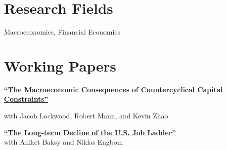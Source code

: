 \documentclass[margin,line]{res}                          %
\newenvironment{list1}{
	\begin{list}{\ding{113}}{%
			\setlength{\itemsep}{0in}
			\setlength{\parsep}{0in} \setlength{\parskip}{0in}
			\setlength{\topsep}{0in} \setlength{\partopsep}{0in}
			\setlength{\leftmargin}{0.17in}}}{\end{list}}
\begin{document}
\begin{resume}
		
		\section{\sc Research Fields}%
	\begin{list1}
		\item[] Macroeconomics, Financial Economics
	\end{list1}
	
	\section{\sc Working Papers}
	\begin{list1}
		\item[] \href{https://danicaratelli.github.io/research/papers/Macroeconomic Consequences of Capital Constraints.pdf}{\textbf{{\color{darkblue}``The Macroeconomic Consequences of Countercyclical Capital Constraints''}}}
		\item[] with Jacob Lockwood, Robert Mann, and Kevin Zhao
		\vspace{7pt}
		\item[] \href{https://danicaratelli.github.io/research/papers/The_Long_term_Decline_of_the_US_Job_Ladder.pdf}{\textbf{{\color{darkblue}``The Long-term Decline of the U.S. Job Ladder''}}}\\ 
		with Aniket Baksy and Niklas Engbom\smallskip
		

\end{list1}
\end{resume}
\end{document}
